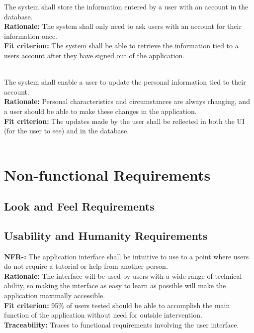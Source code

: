 \documentclass[12pt, titlepage]{article}
\newcounter{NFR_Counter}
\newcounter{FR_Counter}
\begin{document}
The system shall store the information entered by a user with an account in the database.\\
\textbf{Rationale:}
The system shall only need to ask users with an account for their information once.\\
\textbf{Fit criterion:}
The system shall be able to retrieve the information tied to a users account after they have signed out of the application. \\~\\
\addtocounter{FR_Counter}{1}


The system shall enable a user to update the personal information tied to their account.\\
\textbf{Rationale:}
Personal characteristics and circumstances are always changing, and a user should be able to make these changes in the application.\\
\textbf{Fit criterion:}
The updates made by the user shall be reflected in both the UI (for the user to see) and in the database.\\~\\
\addtocounter{FR_Counter}{1}

\section{Non-functional Requirements}

\subsection{Look and Feel Requirements}

\subsection{Usability and Humanity Requirements}

\textbf{NFR-\the\value{NFR_Counter}:}
The application interface shall be intuitive to use to a point where users do not require a tutorial or help from another person. \\
\textbf{Rationale:}
The interface will be used by users with a wide range of technical ability, so making the interface as easy to learn as possible will make the application maximally accessible. \\
\textbf{Fit criterion:}
95\% of users tested should be able to accomplish the main function of the application without need for outside intervention. \\
\textbf{Traceability:}
Traces to functional requirements involving the user interface. \\~\\
\addtocounter{NFR_Counter}{1}
\end{document}

